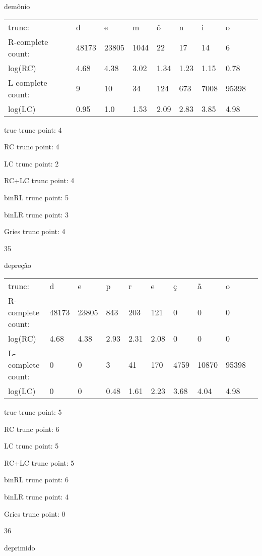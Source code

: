 \documentclass[10pt]{article}
\begin{document}
demônio

\begin{tabular}{l|llllllll}
trunc: & d & e & m & ô & n & i & o & \\ 
R-complete count: & 48173 & 23805 & 1044 & 22 & 17 & 14 & 6 & \\ 
log(RC) & 4.68 & 4.38 & 3.02 & 1.34 & 1.23 & 1.15 & 0.78 & \\ 
L-complete count: & 9 & 10 & 34 & 124 & 673 & 7008 & 95398 & \\ 
log(LC) & 0.95 & 1.0 & 1.53 & 2.09 & 2.83 & 3.85 & 4.98 & \\ 
\end{tabular}

true trunc point: 4

RC trunc point: 4

LC trunc point: 2

RC+LC trunc point: 4

binRL trunc point: 5

binLR trunc point: 3

Gries trunc point: 4

\vspace{1em}

35

depreção

\begin{tabular}{l|lllllllll}
trunc: & d & e & p & r & e & ç & ã & o & \\ 
R-complete count: & 48173 & 23805 & 843 & 203 & 121 & 0 & 0 & 0 & \\ 
log(RC) & 4.68 & 4.38 & 2.93 & 2.31 & 2.08 & 0 & 0 & 0 & \\ 
L-complete count: & 0 & 0 & 3 & 41 & 170 & 4759 & 10870 & 95398 & \\ 
log(LC) & 0 & 0 & 0.48 & 1.61 & 2.23 & 3.68 & 4.04 & 4.98 & \\ 
\end{tabular}

true trunc point: 5

RC trunc point: 6

LC trunc point: 5

RC+LC trunc point: 5

binRL trunc point: 6

binLR trunc point: 4

Gries trunc point: 0

\vspace{1em}

36

deprimido
\end{document}
